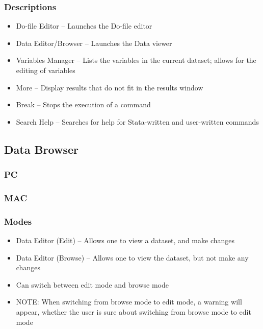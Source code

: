 \documentclass{beamer}
\begin{document}
\begin{frame}
	\frametitle{Descriptions}
		\begin{itemize}
			\item Do-file Editor -- Launches the Do-file editor
			\item Data Editor/Browser -- Launches the Data viewer
			\item Variables Manager -- Lists the variables in the current dataset; allows for the editing of variables
			\item More -- Display results that do not fit in the results window
			\item Break -- Stops the execution of a command
			\item Search Help -- Searches for help for Stata-written and user-written commands
		\end{itemize}
\end{frame}

\subsection{Data Browser}

\begin{frame}
	\frametitle{PC}
\end{frame}

\begin{frame}
	\frametitle{MAC}
\end{frame}

\begin{frame}
	\frametitle{Modes}
		\begin{itemize}
			\item Data Editor (Edit) -- Allows one to view a dataset, and make changes
			\item Data Editor (Browse) -- Allows one to view the dataset, but not make any changes
			\item Can switch between edit mode and browse mode
			\item NOTE: When switching from browse mode to edit mode, a warning will appear, whether the user is sure about switching from browse mode to edit mode
		\end{itemize}
\end{frame}
\end{document}
